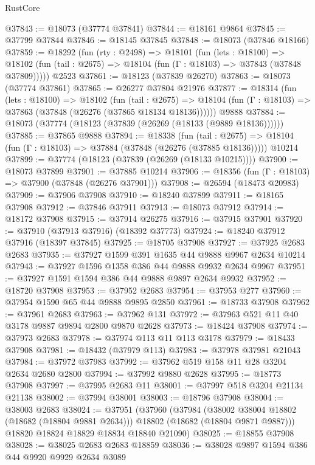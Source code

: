 \begin{lexlean}{RustCore}
\begin{coremodule}
@37843 := @18073 (@37774 @37841)
@37844 := @18161 @9864
@37845 := @37799 @37844
@37846 := @18145 @37845
@37848 := @18073 (@37846 @18166)
@37859 := @18292
    (fun (rty : @2498) =>
    @18101
      (fun (lets : @18100) =>
      @18102 (fun (tail : @2675) => @18104 (fun (Γ : @18103) => @37843 (@37848 @37809)))))
    @2523
@37861 := @18123 (@37839 @26270)
@37863 := @18073 (@37774 @37861)
@37865 := @26277 @37804 @21976
@37877 := @18314
    (fun (lets : @18100) =>
    @18102
      (fun (tail : @2675) =>
      @18104 (fun (Γ : @18103) => @37863 (@37848 (@26276 (@37865 @18134 @18136))))))
    @9888
@37884 := @18073 (@37774 (@18123 (@37839 (@26269 (@18133 (@9889 @18136))))))
@37885 := @37865 @9888
@37894 := @18338
    (fun (tail : @2675) => @18104 (fun (Γ : @18103) => @37884 (@37848 (@26276 (@37885 @18136)))))
    @10214
@37899 := @37774 (@18123 (@37839 (@26269 (@18133 @10215))))
@37900 := @18073 @37899
@37901 := @37885 @10214
@37906 := @18356 (fun (Γ : @18103) => @37900 (@37848 (@26276 @37901)))
@37908 := @26594 (@18473 @20983)
@37909 := @37906 @37908
@37910 := @18240 @37899
@37911 := @18165 @37908
@37912 := @37846 @37911
@37913 := @18073 @37912
@37914 := @18172 @37908
@37915 := @37914 @26275
@37916 := @37915 @37901
@37920 := @37910 (@37913 @37916) (@18392 @37773)
@37924 := @18240 @37912 @37916 (@18397 @37845)
@37925 := @18705 @37908
@37927 := @37925 @2683 @2683
@37935 := @37927 @1599 @391 @1635 @44 @9888 @9967 @2634 @10214
@37943 := @37927 @1596 @1358 @386 @44 @9888 @9932 @2634 @9967
@37951 := @37927 @1591 @1594 @386 @44 @9888 @9897 @2634 @9932
@37952 := @18720 @37908
@37953 := @37952 @2683
@37954 := @37953 @277
@37960 := @37954 @1590 @65 @44 @9888 @9895 @2850
@37961 := @18733 @37908
@37962 := @37961 @2683
@37963 := @37962 @131
@37972 := @37963 @521 @11 @40 @3178 @9887 @9894 @2800 @9870 @2628
@37973 := @18424 @37908
@37974 := @37973 @2683
@37978 := @37974 @113 @11 @113 @3178
@37979 := @18433 @37908
@37981 := @18432 (@37979 @113)
@37983 := @37978 @37981 @21043
@37984 := @37972 @37983
@37992 := @37962 @519 @158 @11 @28 @3204 @2634 @2680 @2800
@37994 := @37992 @9880 @2628
@37995 := @18773 @37908
@37997 := @37995 @2683 @11
@38001 := @37997 @518 @3204 @21134 @21138
@38002 := @37994 @38001
@38003 := @18796 @37908
@38004 := @38003 @2683
@38024 := @37951
    (@37960
      (@37984
        (@38002 @38004 @18802 (@18682 (@18804 @9881 @2634)))
        @18802
        (@18682 (@18804 @9871 @9887)))
      @18820
      @18824
      @18829
      @18834
      @18840
      @21090)
@38025 := @18855 @37908
@38028 := @38025 @2683 @2683 @18859
@38036 := @38028 @9897 @1594 @386 @44 @9920 @9929 @2634 @3089

\end{coremodule}
\end{lexlean}
